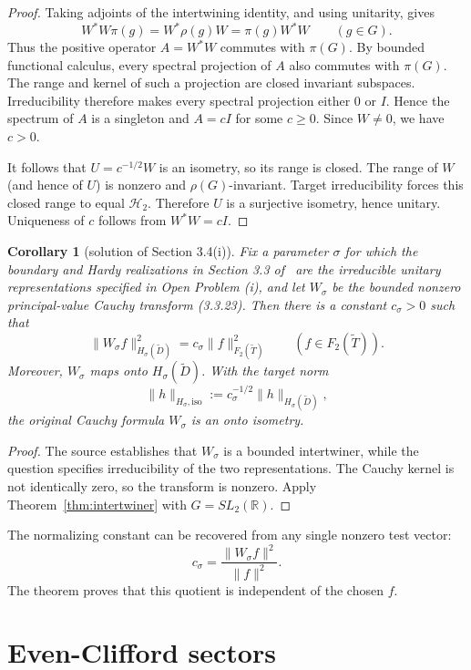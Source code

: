 \documentclass[11pt]{article}
\newtheorem{corollary}[theorem]{Corollary}
\newcommand{\TT}{\widetilde T}
\newcommand{\DD}{\widetilde D}
\begin{document}
\begin{proof}
Taking adjoints of the intertwining identity, and using unitarity, gives
\[
  W^*W\pi(g)=W^*\rho(g)W=\pi(g)W^*W
  \qquad(g\in G).
\]
Thus the positive operator $A=W^*W$ commutes with $\pi(G)$.  By bounded
functional calculus, every spectral projection of $A$ also commutes with
$\pi(G)$.  The range and kernel of such a projection are closed invariant
subspaces.  Irreducibility therefore makes every spectral projection either
$0$ or $I$.  Hence the spectrum of $A$ is a singleton and $A=cI$ for some
$c\ge0$.  Since $W\ne0$, we have $c>0$.

It follows that $U=c^{-1/2}W$ is an isometry, so its range is closed.  The
range of $W$ (and hence of $U$) is nonzero and $\rho(G)$-invariant.  Target
irreducibility forces this closed range to equal $\mathcal H_2$.  Therefore
$U$ is a surjective isometry, hence unitary.  Uniqueness of $c$ follows from
$W^*W=cI$.
\end{proof}

\begin{corollary}[solution of Section 3.4(i)]
\label{cor:application}
Fix a parameter $\sigma$ for which the boundary and Hardy realizations in
Section 3.3 of~\cite{Kisil} are the irreducible unitary representations
specified in Open Problem (i), and let $W_\sigma$ be the bounded nonzero
principal-value Cauchy transform (3.3.23).  Then there is a constant
$c_\sigma>0$ such that
\[
  \|W_\sigma f\|_{H_\sigma(\DD)}^2
    =c_\sigma\|f\|_{F_2(\TT)}^2
  \qquad(f\in F_2(\TT)).
\]
Moreover, $W_\sigma$ maps onto $H_\sigma(\DD)$.  With the target norm
\[
  \|h\|_{H_\sigma,\mathrm{iso}}
    :=c_\sigma^{-1/2}\|h\|_{H_\sigma(\DD)},
\]
the original Cauchy formula $W_\sigma$ is an onto isometry.
\end{corollary}

\begin{proof}
The source establishes that $W_\sigma$ is a bounded intertwiner, while the
question specifies irreducibility of the two representations.  The Cauchy
kernel is not identically zero, so the transform is nonzero.  Apply
Theorem~\ref{thm:intertwiner} with $G=SL_2(\mathbb R)$.
\end{proof}

The normalizing constant can be recovered from any single nonzero test vector:
\[
  c_\sigma=\frac{\|W_\sigma f\|^2}{\|f\|^2}.
\]
The theorem proves that this quotient is independent of the chosen $f$.

\section{Even-Clifford sectors}
\end{document}
